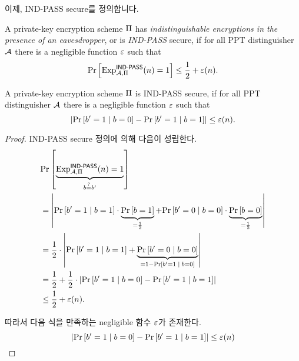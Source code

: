 이제, IND-PASS secure를 정의합니다.
\begin{definition}
  A private-key encryption scheme $\Pi$ has \emph{indistinguishable encryptions
    in the presence of an eavesdropper}, or is \emph{IND-PASS} secure, if for all
  PPT distinguisher $\mathcal{A}$ there is a negligible function $\varepsilon$ such that
  \begin{equation}
    \text{Pr} \left[ \text{Exp}^{\textsf{IND-PASS}}_{\mathcal{A}, \Pi}(n) = 1 \right] \le \frac{1}{2} + \varepsilon(n).
  \end{equation}
  \label{def:ind_pass}
\end{definition}

\begin{lemma}
  A private-key encryption scheme $\Pi$ is IND-PASS secure, if for all
  PPT distinguisher $\mathcal{A}$ there is a negligible function $\varepsilon$ such that
  \begin{equation}
    \left| \text{Pr} \left[ b' = 1 \;|\; b = 0 \right] - \text{Pr} \left[ b' = 1 \;|\; b = 1 \right] \right| \le \varepsilon(n).
  \end{equation}
  \label{lem:ind_pass}
\end{lemma}

\begin{proof}
  IND-PASS secure 정의에 의해 다음이 성립한다.
  \begin{equation}
    \begin{split}
      &\text{Pr} \left[ \underbrace{\text{Exp}^{\textsf{IND-PASS}}_{\mathcal{A}, \Pi}(n) = 1}_{b \overset{?}{=} b'} \right] \\
      &= \left| 
        \text{Pr} \left[ b' = 1 \;|\; b = 1 \right] \cdot \underbrace{\text{Pr} \left[ b = 1 \right]}_{= \frac{1}{2}}
        + \text{Pr} \left[ b' = 0 \;|\; b = 0 \right] \cdot \underbrace{\text{Pr} \left[ b = 0 \right]}_{= \frac{1}{2}}
       \right| \\
      &= \frac{1}{2} \cdot \left| 
        \text{Pr} \left[ b' = 1 \;|\; b = 1 \right] +
        \underbrace{\text{Pr} \left[ b' = 0 \;|\; b = 0 \right]}_{= 1 - \text{Pr} \left[ b' = 1 \;|\; b = 0 \right]}
       \right| \\
      &= \frac{1}{2} + \frac{1}{2} \cdot
      \left| \text{Pr} \left[ b' = 1 \;|\; b = 0 \right] - \text{Pr} \left[ b' = 1 \;|\; b = 1 \right] \right| \\
      &\le \frac{1}{2} + \varepsilon(n).
    \end{split}
  \end{equation}

  따라서 다음 식을 만족하는 negligible 함수 $\varepsilon$가 존재한다.
  \begin{equation}
    \left| \text{Pr} \left[ b' = 1 \;|\; b = 0 \right] - \text{Pr} \left[ b' = 1 \;|\; b = 1 \right] \right| \le \varepsilon(n)
  \end{equation}
\end{proof}

\newpage
